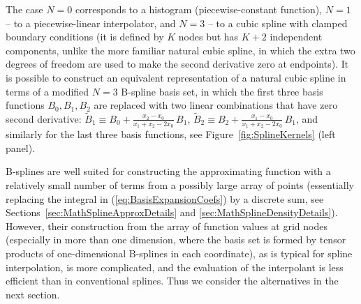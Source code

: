 \documentclass[12pt]{article}
\begin{document}
The case $N=0$ corresponds to a histogram (piecewise-constant function), $N=1$ -- to a piecewise-linear interpolator, and $N=3$ -- to a cubic spline with clamped boundary conditions (it is defined by $K$ nodes but has $K+2$ independent components, unlike the more familiar natural cubic spline, in which the extra two degrees of freedom are used to make the second derivative zero at endpoints). It is possible to construct an equivalent representation of a natural cubic spline in terms of a modified $N=3$ B-spline basis set, in which the first three basis functions $B_0, B_1, B_2$ are replaced with two linear combinations that have zero second derivative: $\tilde B_1 \equiv B_0 + \frac{x_2-x_0}{x_1+x_2-2x_0}\,B_1$, $\tilde B_2 \equiv B_2 + \frac{x_1-x_0}{x_1+x_2-2x_0}\,B_1$, and similarly for the last three basis functions, see Figure~\ref{fig:SplineKernels} (left panel).

B-splines are well suited for constructing the approximating function with a relatively small number of terms from a possibly large array of points (essentially replacing the integral in (\ref{eq:BasisExpansionCoefs}) by a discrete sum, see Sections~\ref{sec:MathSplineApproxDetails} and \ref{sec:MathSplineDensityDetails}). However, their construction from the array of function values at grid nodes (especially in more than one dimension, where the basis set is formed by tensor products of one-dimensional B-splines in each coordinate), as is typical for spline interpolation, is more complicated, and the evaluation of the interpolant is less efficient than in conventional splines. Thus we consider the alternatives in the next section.
\end{document}
